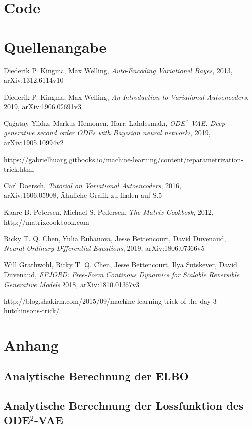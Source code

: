 \documentclass[12pt]{article}
\begin{document}
	\section[Code]{Code}
	
	\section[Quellenangabe]{Quellenangabe}
	\begin{thebibliography}{9}
		Diederik P. Kingma, Max Welling,
		\textit{Auto-Encoding Variational Bayes},
		2013,\\
		arXiv:1312.6114v10
		
		Diederik P. Kingma, Max Welling,
		\textit{An Introduction to Variational Autoencoders},
		2019,
		arXiv:1906.02691v3
		
		Çağatay Yıldız, Markus Heinonen, Harri Lähdesmäki,
		\textit{ODE$^{\ 2}$-VAE: Deep generative second order ODEs with Bayesian neural networks},
		2019,
		arXiv:1905.10994v2
		
		https://gabrielhuang.gitbooks.io/machine-learning/content/reparametrization-trick.html
		
		Carl Doersch,
		\textit{Tutorial on Variational Autoencoders},
		2016,\\
		arXiv:1606.05908,
		Ähnliche Grafik zu finden auf S.5
		
		Kaare B. Petersen, Michael S. Pedersen,
		\textit{The Matrix Cookbook},
		2012,
		http://matrixcookbook.com%
		
		Ricky T. Q. Chen, Yulia Rubanova, Jesse Bettencourt, David Duvenaud,\\
		\textit{Neural Ordinary Differential Equations},
		2019, arXiv:1806.07366v5
		
		Will Grathwohl, Ricky T. Q. Chen, Jesse Bettencourt, Ilya Sutskever, David Duvenaud,
		\textit{FFJORD:  Free-Form Continous Dynamics for Scalable Reversible Generative Models}
		2018, arXiv:1810.01367v3
		
		http://blog.shakirm.com/2015/09/machine-learning-trick-of-the-day-3-hutchinsons-trick/
		
	\end{thebibliography}
	\section[Anhang]{Anhang}
	\subsection[Analytische Berechnung der ELBO]{Analytische Berechnung der ELBO}
	\subsection[Analytische Berechnung der Lossfunktion des ODE$^2$-VAE]{Analytische Berechnung der Lossfunktion des ODE$^2$-VAE}
\end{document}
